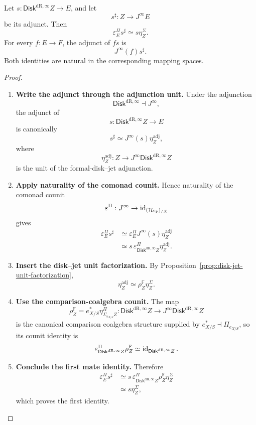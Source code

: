 \begin{lemma}
\label{lem:jet-mates}
Let \(s:\mathsf{Disk}^{\mathrm{dR},\infty} Z\to E\), and let
\[
  s^\sharp:Z\to J^\infty E
\]
be its adjunct. Then
\[
  \varepsilon^\Pi_Es^\sharp\simeq s\eta^\Sigma_Z.
\]
For every \(f:E\to F\), the adjunct of \(fs\) is
\[
  J^\infty(f)s^\sharp.
\]
Both identities are natural in the corresponding mapping spaces.
\end{lemma}

\begin{proof}
\leavevmode
\begin{enumerate}[label=\textup{(\arabic*)}]
    \item \textbf{Write the adjunct through the adjunction unit.}
Under the adjunction
\[
  \mathsf{Disk}^{\mathrm{dR},\infty}\dashv J^\infty,
\]
the adjunct of
\[
  s:\mathsf{Disk}^{\mathrm{dR},\infty} Z\to E
\]
is canonically
\[
  s^\sharp
  \simeq
  J^\infty(s)\eta^{\mathrm{adj}}_Z,
\]
where
\[
  \eta^{\mathrm{adj}}_Z:Z\to J^\infty \mathsf{Disk}^{\mathrm{dR},\infty} Z
\]
is the unit of the formal-disk--jet adjunction.

    \item \textbf{Apply naturality of the comonad counit.}
Hence naturality of the comonad
counit
\[
  \varepsilon^\Pi:J^\infty\to\operatorname{id}_{(\mathcal H_{\operatorname{Sp}})_{/X}}
\]
gives
\[
\begin{aligned}
  \varepsilon^\Pi_Es^\sharp
  &\simeq
  \varepsilon^\Pi_EJ^\infty(s)\eta^{\mathrm{adj}}_Z\\
  &\simeq
  s\,\varepsilon^\Pi_{\mathsf{Disk}^{\mathrm{dR},\infty} Z}\eta^{\mathrm{adj}}_Z.
\end{aligned}
\]

    \item \textbf{Insert the disk--jet unit factorization.}
By
Proposition~\ref{prop:disk-jet-unit-factorization},
\[
  \eta^{\mathrm{adj}}_Z\simeq\rho_Z^{\mathbb F}\eta^\Sigma_Z.
\]

    \item \textbf{Use the comparison-coalgebra counit.}
The map
\[
  \rho_Z^{\mathbb F}
  =
  e_{X/S}^*\eta^\Pi_{\Sigma_{e_{X/S}} Z}:
  \mathsf{Disk}^{\mathrm{dR},\infty} Z\to J^\infty \mathsf{Disk}^{\mathrm{dR},\infty} Z
\]
is the canonical comparison coalgebra structure supplied by
\(e_{X/S}^*\dashv\Pi_{e_{X/S}}\), so its counit identity is
\[
  \varepsilon^\Pi_{\mathsf{Disk}^{\mathrm{dR},\infty} Z}\rho_Z^{\mathbb F}
  \simeq
  \operatorname{id}_{\mathsf{Disk}^{\mathrm{dR},\infty} Z}.
\]

    \item \textbf{Conclude the first mate identity.}
Therefore
\[
\begin{aligned}
  \varepsilon^\Pi_Es^\sharp
  &\simeq
  s\,\varepsilon^\Pi_{\mathsf{Disk}^{\mathrm{dR},\infty} Z}\rho_Z^{\mathbb F}\eta^\Sigma_Z\\
  &\simeq
  s\eta^\Sigma_Z,
\end{aligned}
\]
which proves the first identity.


\end{enumerate}
\end{proof}
